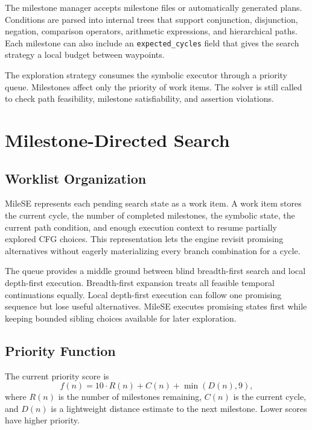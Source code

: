 \documentclass[conference]{IEEEtran}
\begin{document}
The milestone manager accepts milestone files or automatically generated plans. Conditions are parsed into internal trees that support conjunction, disjunction, negation, comparison operators, arithmetic expressions, and hierarchical paths. Each milestone can also include an \texttt{expected\_cycles} field that gives the search strategy a local budget between waypoints.

The exploration strategy consumes the symbolic executor through a priority queue. Milestones affect only the priority of work items. The solver is still called to check path feasibility, milestone satisfiability, and assertion violations.

\section{Milestone-Directed Search}
\label{sec:method}

\subsection{Worklist Organization}
MileSE represents each pending search state as a work item. A work item stores the current cycle, the number of completed milestones, the symbolic state, the current path condition, and enough execution context to resume partially explored CFG choices. This representation lets the engine revisit promising alternatives without eagerly materializing every branch combination for a cycle.

The queue provides a middle ground between blind breadth-first search and local depth-first execution. Breadth-first expansion treats all feasible temporal continuations equally. Local depth-first execution can follow one promising sequence but lose useful alternatives. MileSE executes promising states first while keeping bounded sibling choices available for later exploration.

\subsection{Priority Function}
The current priority score is
\begin{equation}
f(n) = 10 \cdot R(n) + C(n) + \min(D(n), 9),
\end{equation}
where $R(n)$ is the number of milestones remaining, $C(n)$ is the current cycle, and $D(n)$ is a lightweight distance estimate to the next milestone. Lower scores have higher priority.
\end{document}
